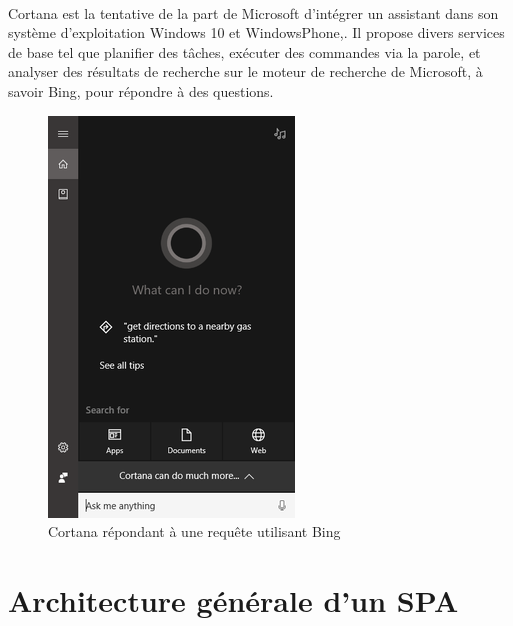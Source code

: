 \paragraph{}
Cortana est la tentative de la part de Microsoft d'intégrer un assistant dans son système d'exploitation Windows 10 et WindowsPhone,. Il propose divers services de base tel que planifier des tâches, exécuter des commandes via la parole, et analyser des résultats de recherche sur le moteur de recherche de Microsoft, à savoir Bing, pour répondre à des questions.
\begin{figure}[H]
	\centering
	\includegraphics[width=.4\linewidth]{images/cortana/weather.png}
	\caption{Cortana répondant à une requête utilisant Bing } 
\end{figure}

\section{Architecture générale d'un SPA}
